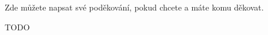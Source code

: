 \documentclass[11pt,twoside,a4paper]{book}
\begin{document}
	
	\translate					%



	\coverpagestarts


	\acknowledgements
	\noindent
	Zde můžete napsat své poděkování, pokud chcete a máte komu děkovat.





 
	\abstractpage

	TODO

\end{document}
